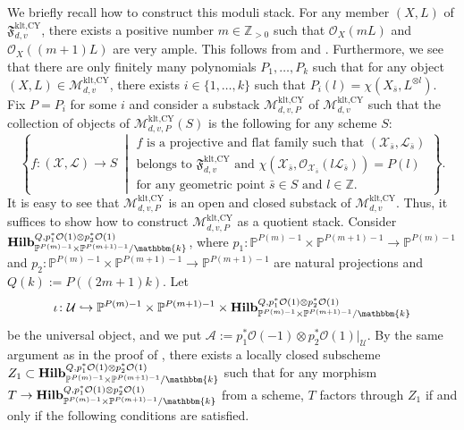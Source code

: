 \documentclass[12pt,twoside]{amsart}
\theoremstyle{definition}
\begin{document}
We briefly recall how to construct this moduli stack. 
For any member $(X,L)$ of $\mathfrak{F}^{\text{klt,CY}}_{d,v}$, there exists a positive number $m\in\mathbb{Z}_{>0}$ such that $\mathcal{O}_X(mL)$ and $\mathcal{O}_{X}((m+1)L)$ are very ample.
This follows from \cite[Theorem 1.1]{kollar-eff-basepoint-free} and \cite[Lemma 7.1]{fujino-eff-slc}.
Furthermore, we see that there are only finitely many polynomials $P_1,\ldots,P_k$ such that for any object $(X,L)\in \mathcal{M}^{\textrm{klt,CY}}_{d,v}$, there exists $i\in\{1,\ldots,k\}$ such that $P_i(l)=\chi(X_{\bar{s}},L^{\otimes l})$.
Fix $P=P_i$ for some $i$ and consider a substack $\mathcal{M}^{\textrm{klt,CY}}_{d,v,P}$ of $\mathcal{M}^{\textrm{klt,CY}}_{d,v}$ such that the collection of objects of $\mathcal{M}^{\textrm{klt,CY}}_{d,v,P}(S)$ is the following for any scheme $S$:
 \[
\left\{
 f\colon(\mathcal{X},\mathcal{L})\to S
\;\middle|
\begin{array}{l}
\text{$f$ is a projective and flat family such that $(\mathcal{X}_{\bar{s}},\mathcal{L}_{\bar{s}})$}\\
\text{belongs to $\mathfrak{F}^{\text{klt,CY}}_{d,v}$ and $\chi(\mathcal{X}_{\bar{s}},\mathcal{O}_{\mathcal{X}_{\bar{s}}}(l\mathcal{L}_{\bar{s}}))=P(l)$}\\
\text{for any geometric  point $\bar{s}\in S$ and $l\in\mathbb{Z}$.}
\end{array}\right\}.
    \]
It is easy to see that $\mathcal{M}^{\textrm{klt,CY}}_{d,v,P}$ is an open and closed substack of $\mathcal{M}^{\textrm{klt,CY}}_{d,v}$.
Thus, it suffices to show how to construct $\mathcal{M}^{\textrm{klt,CY}}_{d,v,P}$ as a quotient stack.
Consider $\mathbf{Hilb}_{\mathbb{P}^{P(m)-1}\times\mathbb{P}^{P(m+1)-1}/\mathbbm{k}}^{Q,p_1^*\mathcal{O}(1)\otimes p_2^*\mathcal{O}(1)}$, where $p_1\colon \mathbb{P}^{P(m)-1}\times\mathbb{P}^{P(m+1)-1}\to \mathbb{P}^{P(m)-1}$ and $p_2\colon \mathbb{P}^{P(m)-1}\times\mathbb{P}^{P(m+1)-1}\to \mathbb{P}^{P(m+1)-1}$ are natural projections and $Q(k):=P((2m+1)k)$.
Let 
$$\iota\colon \mathcal{U}\hookrightarrow \mathbb{P}^{P(m)-1}\times\mathbb{P}^{P(m+1)-1}\times \mathbf{Hilb}_{\mathbb{P}^{P(m)-1}\times\mathbb{P}^{P(m+1)-1}/\mathbbm{k}}^{Q,p_1^*\mathcal{O}(1)\otimes p_2^*\mathcal{O}(1)}$$
 be the universal object, and we put $\mathcal{A}:=p_1^*\mathcal{O}(-1)\otimes p_2^*\mathcal{O}(1)|_{\mathcal{U}}$.
By the same argument as in the proof of \cite[Proposition 5.6]{HH}, there exists a locally closed subscheme $Z_1 \subset \mathbf{Hilb}_{\mathbb{P}^{P(m)-1}\times\mathbb{P}^{P(m+1)-1}/\mathbbm{k}}^{Q,p_1^*\mathcal{O}(1)\otimes p_2^*\mathcal{O}(1)}$ such that for any morphism $T\to \mathbf{Hilb}_{\mathbb{P}^{P(m)-1}\times\mathbb{P}^{P(m+1)-1}/\mathbbm{k}}^{Q,p_1^*\mathcal{O}(1)\otimes p_2^*\mathcal{O}(1)}$ from a scheme, $T$ factors through $Z_1$ if and only if the following conditions are satisfied.
\end{document}
